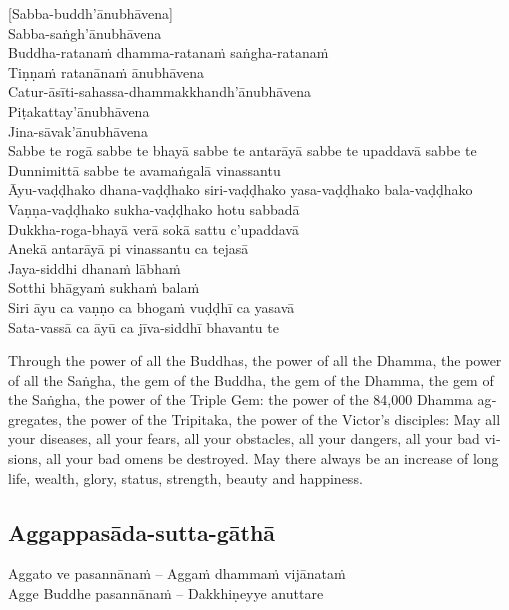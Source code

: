 [Sabba-buddh'ānubhāvena]\\
Sabba-saṅgh'ānubhāvena\\
Buddha-ratanaṁ dhamma-ratanaṁ saṅgha-ratanaṁ\\
Tiṇṇaṁ ratanānaṁ ānubhāvena\\
Catur-āsīti-sahassa-dhammakkhandh'ānubhāvena\\
Piṭakattay'ānubhāvena\\
Jina-sāvak'ānubhāvena\\
Sabbe te rogā sabbe te bhayā sabbe te antarāyā sabbe te upaddavā sabbe te\\
Dunnimittā sabbe te avamaṅgalā vinassantu\\
Āyu-vaḍḍhako dhana-vaḍḍhako siri-vaḍḍhako yasa-vaḍḍhako bala-vaḍḍhako\\
Vaṇṇa-vaḍḍhako sukha-vaḍḍhako hotu sabbadā\\
Dukkha-roga-bhayā verā sokā sattu c'upaddavā\\
Anekā antarāyā pi vinassantu ca tejasā\\
Jaya-siddhi dhanaṁ lābhaṁ\\
Sotthi bhāgyaṁ sukhaṁ balaṁ\\
Siri āyu ca vaṇṇo ca bhogaṁ vuḍḍhī ca yasavā\\
Sata-vassā ca āyū ca jīva-siddhī bhavantu te

\begin{english}
  Through the power of all the Buddhas, the power of all the Dhamma, the power of all the Saṅgha, the gem of the Buddha, the gem of the Dhamma, the gem of the Saṅgha, the power of the Triple Gem: the power of the 84,000 Dhamma aggregates, the power of the Tripitaka, the power of the Victor’s disciples: May all your diseases, all your fears, all your obstacles, all your dangers, all your bad visions, all your bad omens be destroyed. May there always be an increase of long life, wealth, glory, status, strength, beauty and happiness.
\end{english}

\suttaRef{[MJG]}

\subsection{Aggappasāda-sutta-gāthā}
\label{aggappasada-sutta-gatha}

\begin{twochants}
  Aggato ve pasannānaṁ – Aggaṁ dhammaṁ vijānataṁ\\
  Agge Buddhe pasannānaṁ – Dakkhiṇeyye anuttare
\end{twochants}

